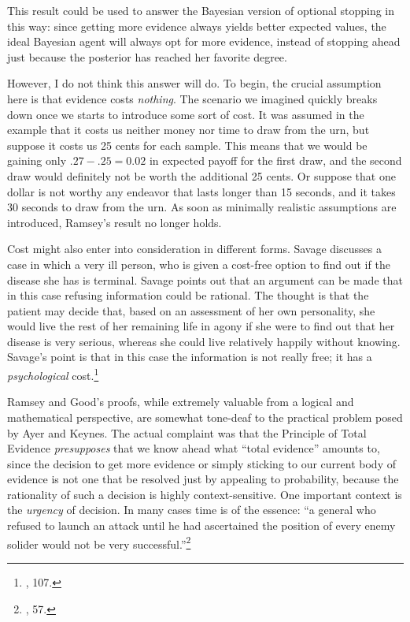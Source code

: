 This result could be used to answer the Bayesian version of optional
stopping in this way: since getting more evidence always yields better
expected values, the ideal Bayesian agent will always opt for more
evidence, instead of stopping ahead just because the posterior has
reached her favorite degree.

However, I do not think this answer will do. To begin, the crucial
assumption here is that evidence costs \emph{nothing}. The scenario we
imagined quickly breaks down once we starts to introduce some sort of
cost. It was assumed in the example that it costs us neither money nor
time to draw from the urn, but suppose it costs us 25 cents for each
sample. This means that we would be gaining only \(.27-.25 = 0.02\) in
expected payoff for the first draw, and the second draw would definitely
not be worth the additional 25 cents. Or suppose that one dollar is not
worthy any endeavor that lasts longer than 15 seconds, and it takes 30
seconds to draw from the urn. As soon as minimally realistic assumptions
are introduced, Ramsey's result no longer holds.

Cost might also enter into consideration in different forms. Savage
discusses a case in which a very ill person, who is given a cost-free option
to find out if the disease she has is terminal. Savage points out that an argument can be made that in this case refusing information could be rational. The thought is that the patient
may decide that, based on an assessment of her own personality, she
would live the rest of her remaining life in agony if she were to find
out that her disease is very serious, whereas she could live relatively
happily without knowing. Savage's point is that in this case the
information is not really free; it has a \emph{psychological}
cost.\footnote{\cite{savage}, 107.} 

Ramsey and Good's proofs, while extremely valuable from a logical and
mathematical perspective, are somewhat tone-deaf to the practical problem
posed by Ayer and Keynes. The actual complaint was that the Principle of
Total Evidence \emph{presupposes} that we know ahead what ``total
evidence'' amounts to, since the decision to get more evidence or simply
sticking to our current body of evidence is not one that be resolved
just by appealing to probability, because the rationality of such a
decision is highly context-sensitive. One important context is the
\emph{urgency} of decision. In many cases time is of the essence: ``a general who refused to
launch an attack until he had ascertained the position of every enemy
solider would not be very successful.''\footnote{\cite{ayerpae}, 57.}

